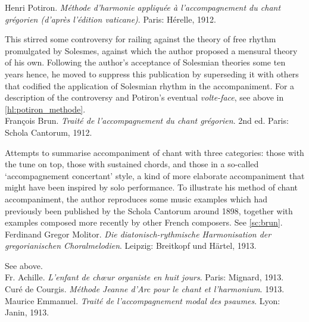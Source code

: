     \parindent=0pt
    \hangindent=0pt
  Henri Potiron. \emph{Méthode d'harmonie appliquée à l'accompagnement du chant grégorien (d'après l'édition vaticane)}. Paris:  Hérelle, 1912.

     \parindent=20pt
     \hangindent=20pt
     This stirred some controversy for railing against the theory of free rhythm promulgated by Solesmes, against which the author proposed a mensural theory of his own. Following the author's acceptance of Solesmian theories some ten years hence, he moved to suppress this publication by superseding it with others that codified the application of Solesmian rhythm in the accompaniment. For a description of the controversy and Potiron's eventual \emph{volte-face}, see above in \cref{hl:potiron_methode}.\\

    \parindent=0pt
    \hangindent=0pt
  François Brun. \emph{Traité de l'accompagnement du chant grégorien}. 2nd ed. Paris:  Schola Cantorum, 1912.

     \parindent=20pt
     \hangindent=20pt
     Attempts to summarise accompaniment of chant with three categories: those with the tune on top, those with sustained chords, and those in a so-called `accompagnement concertant' style, a kind of more elaborate accompaniment that might have been inspired by solo performance. To illustrate his method of chant accompaniment, the author reproduces some music examples which had previously been published by the Schola Cantorum around 1898, together with examples composed more recently by other French composers. See \cref{sc:brun}.\\

    \parindent=0pt
    \hangindent=0pt
  Ferdinand Gregor Molitor. \emph{Die diatonisch-rythmische Harmonisation der gregorianischen Choralmelodien}. Leipzig:  Breitkopf und Härtel, 1913.

     \parindent=20pt
     \hangindent=20pt
     See  above.\\

    \parindent=0pt
    \hangindent=0pt
  \covid{}Fr. Achille. \emph{L'enfant de chœur organiste en huit jours}. Paris:  Mignard, 1913. \\

    \parindent=0pt
    \hangindent=0pt
  \covid{}Curé de Courgis. \emph{Méthode Jeanne d'Arc pour le chant et l'harmonium}. 1913. \\

    \parindent=0pt
    \hangindent=0pt
  Maurice Emmanuel. \emph{Traité de l'accompagnement modal des psaumes}. Lyon:  Janin, 1913.

